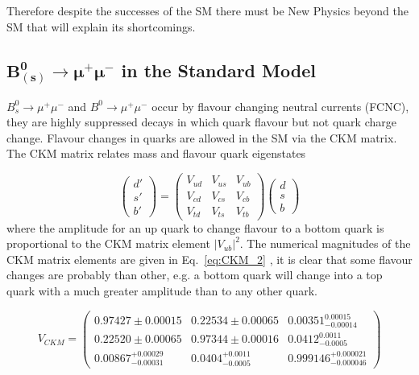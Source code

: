 Therefore despite the successes of the SM there must be New Physics beyond the SM that will explain its shortcomings.



\subsection{$\boldsymbol{ B_{(s)}^{0} \to \mu^{+} \mu^{-}}$ in the Standard Model }

$B_{s}^{0} \to \mu^{+} \mu^{-}$ and $B^{0} \to \mu^{+} \mu^{-}$ occur by flavour changing neutral currents (FCNC), they are highly suppressed decays in which quark flavour but not quark charge change. Flavour changes in quarks are allowed
in the SM via the CKM matrix. The CKM matrix relates mass and flavour quark eigenstates 

$$
 \begin{pmatrix}
  d' \\
  s' \\
  b'
 \end{pmatrix}
=
\begin{pmatrix}
  V_{ud} & V_{us} & V_{ub} \\
  V_{cd} & V_{cs} & V_{cb} \\
 V_{td} & V_{ts} & V_{tb} 
 \end{pmatrix}
 \begin{pmatrix}
  d \\
  s \\
  b
 \end{pmatrix}
$$
where the amplitude for an up quark to change flavour 
to a bottom quark is proportional to the CKM matrix element $|V_{ub}|^{2}$. The numerical magnitudes of the CKM matrix elements are given in Eq.~\eqref{eq:CKM_2} \cite{PDG}, it is clear that some flavour changes
are probably than other, e.g. a bottom quark will change into a top quark with a much greater amplitude than to any other quark.

\begin{equation} \label{eq:CKM_2}
V_{CKM} = 
\begin{pmatrix}
   0.97427\pm0.00015 & 0.22534\pm0.00065 & 0.00351^{0.00015}_{-0.00014} \\

    0.22520\pm0.00065 & 0.97344\pm0.00016 & 0.0412^{0.0011}_{-0.0005} \\


    0.00867^{+0.00029}_{−0.00031}  & 0.0404^{+0.0011}_{−0.0005} & 0.999146^{+0.000021}_{−0.000046}

 \end{pmatrix}
\end{equation}




